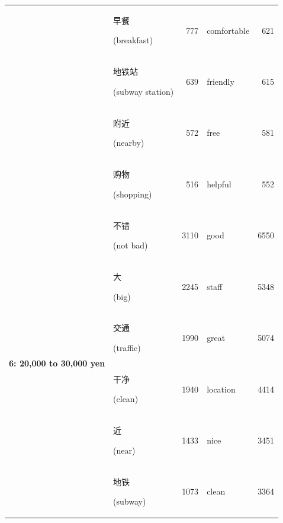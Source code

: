 \documentclass[smallextended,natbib]{svjour3}       %
\begin{document}
\begin{table}[ht]
{\begin{tabular}{|c|lr|lr|}
                                                             & \begin{CJK}{UTF8}{gbsn}早餐\end{CJK} (breakfast)       & 777   & comfortable & 621   \\  
                                                             & \begin{CJK}{UTF8}{gbsn}地铁站\end{CJK} (subway station) & 639   & friendly    & 615   \\  
                                                             & \begin{CJK}{UTF8}{gbsn}附近\end{CJK} (nearby)          & 572   & free        & 581   \\  
                                                             & \begin{CJK}{UTF8}{gbsn}购物\end{CJK} (shopping)        & 516   & helpful     & 552   \\ \hline
        \multirow{10}{*}{\textbf{6: 20,000 to 30,000 yen}}   & \begin{CJK}{UTF8}{gbsn}不错\end{CJK} (not bad)         & 3110  & good        & 6550  \\  
                                                             & \begin{CJK}{UTF8}{gbsn}大\end{CJK} (big)              & 2245  & staff       & 5348  \\  
                                                             & \begin{CJK}{UTF8}{gbsn}交通\end{CJK} (traffic)         & 1990  & great       & 5074  \\  
                                                             & \begin{CJK}{UTF8}{gbsn}干净\end{CJK} (clean)           & 1940  & location    & 4414  \\  
                                                             & \begin{CJK}{UTF8}{gbsn}近\end{CJK} (near)             & 1433  & nice        & 3451  \\  
                                                             & \begin{CJK}{UTF8}{gbsn}地铁\end{CJK} (subway)          & 1073  & clean       & 3364  \\  

\end{tabular}}
\end{table}
\end{document}

